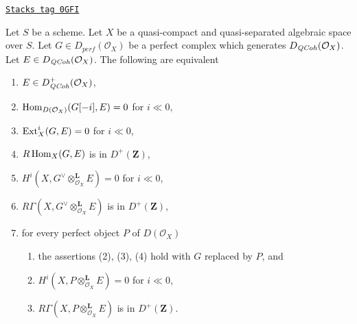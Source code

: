 \begin{proposition}
\label{spaces-perfect-proposition-detecting-bounded-below}
\href{https://stacks.math.columbia.edu/tag/0GFI}{\texttt{Stacks tag 0GFI}}

Let $S$ be a scheme.
Let $X$ be a quasi-compact and quasi-separated algebraic space over $S$.
Let $G \in D_{perf}(\mathcal{O}_X)$ be a perfect complex which generates
$D_{\mathit{QCoh}} (\mathcal{O}_X)$. Let $E \in D_{\mathit{QCoh}} (\mathcal{O}_X)$.
The following are equivalent
\begin{enumerate}
\item $E \in D^+_{\mathit{QCoh}} (\mathcal{O}_X)$,
\item $\operatorname{Hom}_{D(\mathcal{O}_X)}(G[-i], E) = 0$ for $i \ll 0$,
\item $\operatorname{Ext}^i_X(G, E) = 0$ for $i \ll 0$,
\item $R\operatorname{Hom}_X(G, E)$ is in $D^+(\mathbf{Z})$,
\item $H^i(X, G^\vee \otimes_{\mathcal{O}_X}^\mathbf{L} E) = 0$
for $i \ll 0$,
\item $R\Gamma(X, G^\vee \otimes_{\mathcal{O}_X}^\mathbf{L} E)$
is in $D^+(\mathbf{Z})$,
\item for every perfect object $P$ of $D(\mathcal{O}_X)$
\begin{enumerate}
\item the assertions (2), (3), (4) hold with $G$ replaced by $P$, and
\item $H^i(X, P \otimes_{\mathcal{O}_X}^\mathbf{L} E) = 0$ for $i \ll 0$,
\item $R\Gamma(X, P \otimes_{\mathcal{O}_X}^\mathbf{L} E)$
is in $D^+(\mathbf{Z})$.
\end{enumerate}
\end{enumerate}
\end{proposition}

